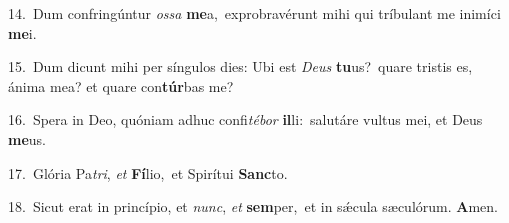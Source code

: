 {\numbfont\textcolor{\numbcolor}{14.}}~Dum confringúntur \textit{os}\-\textit{sa} \textbf{me}\-a,~\star exprobravérunt mihi qui tríbulant me inimíci \textbf{me}\-i.\par
{\numbfont\textcolor{\numbcolor}{15.}}~Dum dicunt mihi per síngulos dies: Ubi est \textit{De}\-\textit{us} \textbf{tu}\-us?~\star quare tristis es, ánima mea? et quare con\-\textbf{túr}\-bas me?\par
{\numbfont\textcolor{\numbcolor}{16.}}~Spera in Deo, quóniam adhuc confi\-\textit{té}\-\textit{bor} \textbf{il}\-li:~\star salutáre vultus mei, et Deus \textbf{me}\-us.\par
{\numbfont\textcolor{\numbcolor}{17.}}~Glória Pa\-\textit{tri}\-, \textit{et} \textbf{Fí}\-lio,~\star et Spirítui \textbf{Sanc}\-to.\par
{\numbfont\textcolor{\numbcolor}{18.}}~Sicut erat in princípio, et \textit{nunc}\-, \textit{et} \textbf{sem}\-per,~\star et in sǽcula sæculórum. \textbf{A}\-men.\par
